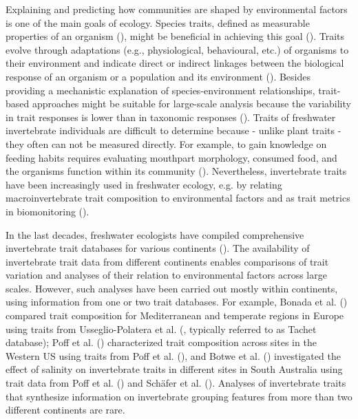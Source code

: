 \documentclass{article}
\begin{document}
Explaining and predicting how communities are shaped by environmental factors is one of the main goals of ecology. Species traits, defined as measurable properties of an organism (\cite{mcgill_rebuilding_2006}), might be beneficial in achieving this goal (\cite{heino_jani_macroecological_2013}). Traits evolve through adaptations (e.g., physiological, behavioural, etc.) of organisms to their environment and indicate direct or indirect linkages between the biological response of an organism or a population and its environment (\cite{southwood_habitat_1977, verberk_delivering_2013}).
Besides providing a mechanistic explanation of species-environment relationships, trait-based approaches might be suitable for large-scale analysis because the variability in trait responses is lower than in taxonomic responses (\cite{bonada_taxonomic_2007, baird_toward_2011}). Traits of freshwater invertebrate individuals are difficult to determine because - unlike plant traits - they often can not be measured directly. For example, to gain knowledge on feeding habits requires evaluating mouthpart morphology, consumed food, and the organisms function within its community (\cite{moog_comprehensive_nodate}). Nevertheless, invertebrate traits have been increasingly used in freshwater ecology, e.g. by relating macroinvertebrate trait composition to environmental factors and as trait metrics in biomonitoring (\cite{poff_developing_2010, szocs_effects_2014, bhowmik_large_2015, menezes_beyond_2010}).

In the last decades, freshwater ecologists have compiled comprehensive invertebrate trait databases for various continents (\cite{usseglio-polatera_biomonitoring_2000, schmidt-kloiber_www.freshwaterecology.info_2015, vieira_database_nodate, Philips_and_Smith_NZ_DB_2018, kefford_integrated_2020, tomanova_trophic_2006}). The availability of invertebrate trait data from different continents enables comparisons of trait variation and analyses of their relation to environmental factors across large scales. However, such analyses have been carried out mostly within continents, using information from one or two trait databases. For example, Bonada et al. (\cite{bonada_taxonomic_2007}) compared trait composition for Mediterranean and temperate regions in Europe using traits from Usseglio-Polatera et al. (\cite{usseglio-polatera_biomonitoring_2000}, typically referred to as Tachet database); Poff et al. (\cite{poff_developing_2010}) characterized trait composition across sites in the Western US using traits from Poff et al. (\cite{poff_functional_2006}), and Botwe et al. (\cite{botwe_effects_2018}) investigated the effect of salinity on invertebrate traits in different sites in South Australia using trait data from Poff et al. (\cite{poff_functional_2006}) and Schäfer et al. (\cite{schafer_trait_2011}). Analyses of invertebrate traits that synthesize information on invertebrate grouping features from more than two different continents are rare. 
\end{document}

